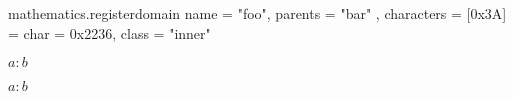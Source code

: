 \startluacode
    mathematics.registerdomain {
        name       = "foo",
        parents    = { "bar" },
        characters = {
            [0x3A] = {
                char  = 0x2236,
                class = "inner"
            }
        }
    }
\stopluacode

\startTEXpage
    $a: b$\par
    \setupmathematics[domain=foo]$a: b$\par
    \par
\stopTEXpage
